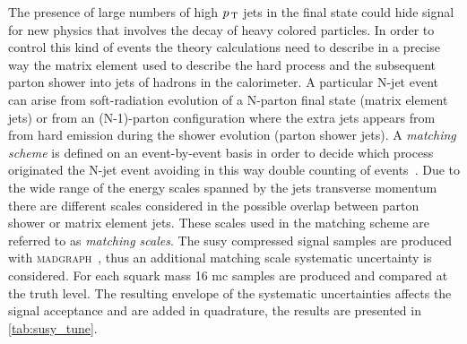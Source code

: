 The presence of large numbers of high $p_\mathrm{\, T}$ jets in the final state could hide
signal for new physics that involves the decay of heavy colored particles. In
order to control this kind of events the theory calculations need to describe in
a precise way the matrix element used to describe the hard process and the
subsequent parton shower into jets of hadrons in the calorimeter. A particular
N-jet event can arise from soft-radiation evolution of a N-parton final state
(matrix element jets) or from an (N-1)-parton configuration where the extra jets
appears from from hard emission during the shower evolution (parton shower
jets). A \emph{matching scheme} is defined on an event-by-event basis in order
to decide which process originated the N-jet event avoiding in this way double
counting of events~\cite{Matching}. Due to the wide range of the energy scales
spanned by the jets transverse momentum there are different scales considered in
the possible overlap between parton shower or matrix element jets. These scales
used in the matching scheme are referred to as \emph{matching scales}. The
\gls{susy} compressed signal samples are produced with
\textsc{madgraph}~\cite{MADGRAPH}, thus an additional matching scale systematic
uncertainty is considered. %
For each squark mass 16 \gls{mc} samples are produced and compared at the truth
level. The resulting envelope of the systematic uncertainties affects the signal
acceptance and are added in quadrature, the results are presented in
\cref{tab:susy_tune}.
\begin{table}[!h]
  \centering
\caption{Theoretical uncertainty in \% on the \gls{susy} compressed spectra
  signal region acceptance as function of the $\met$ bin in the signal region,
  from tune, matching, initial and final state radiation systematic
  uncertainties. The final value is a common envelope valid for all the
  \gls{susy} compressed models.}
  \label{tab:susy_tune}
\end{table}
